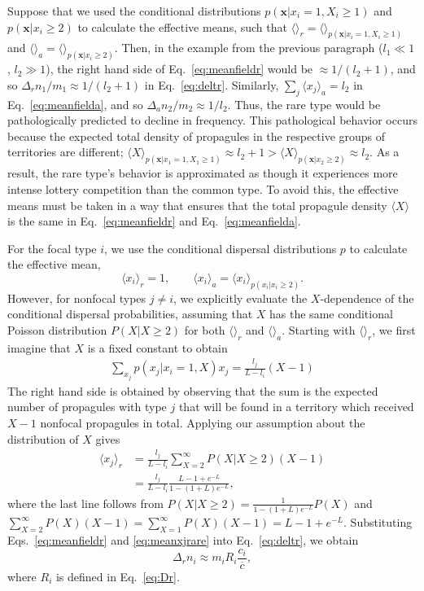 \documentclass[12pt]{article}
\begin{document}
Suppose that we used the conditional distributions $p({\mathbf x}|x_i=1,X_i\geq 1)$ and $p({\mathbf x}|x_i\geq 2)$ to calculate the effective means, such that $\langle \rangle_r=\langle \rangle_{p({\mathbf x}|x_i=1,X_i\geq 1)}$ and $\langle \rangle_a=\langle \rangle_{p({\mathbf x}|x_i\geq 2)}$. Then, in the example from the previous paragraph ($l_1\ll 1$, $l_2\gg 1$), the right hand side of Eq.~\eqref{eq:meanfieldr} would be $\approx 1/(l_2+1)$, and so $\Delta_r n_1/m_1 \approx 1/(l_2+1)$ in Eq.~\eqref{eq:deltr}. Similarly, $\sum_j \langle x_j\rangle_a = l_2$ in Eq.~\eqref{eq:meanfielda}, and so $\Delta_a n_2/m_2 \approx 1/l_2$. Thus, the rare type would be pathologically predicted to decline in frequency. This pathological behavior occurs because the expected total density of propagules in the respective groups of territories are different; $\langle X \rangle_{p({\mathbf x}|x_1=1,X_1\geq 1)}\approx l_2+1 > \langle X \rangle_{p({\mathbf x}|x_2\geq 2)}\approx l_2 $. As a result, the rare type's behavior is approximated as though it experiences more intense lottery competition than the common type. To avoid this, the effective means must be taken in a way that ensures that the total propagule density $\langle X \rangle$ is the same in Eq.~\eqref{eq:meanfieldr} and Eq.~\eqref{eq:meanfielda}. 

For the focal type $i$, we use the conditional dispersal distributions $p$ to calculate the effective mean, 
\begin{equation}
\langle x_i \rangle_r=1,\qquad \langle x_i \rangle_a = \langle x_i \rangle_{p(x_i|x_i\geq 2)}.
\end{equation}
However, for nonfocal types $j\neq i$, we explicitly evaluate the $X$-dependence of the conditional dispersal probabilities, assuming that $X$ has the same conditional Poisson distribution $P(X|X\geq 2)$ for both $\langle \rangle_r$ and $\langle \rangle_a$. Starting with $\langle \rangle_r$, we first imagine that $X$ is a fixed constant to obtain
\begin{align}
\sum_{x_j} p(x_j|x_i=1,X)x_j=\frac{l_j}{L-l_i}(X-1)
\label{eq:raremonster1}
\end{align}
The right hand side is obtained by observing that the sum is the expected number of propagules with type $j$ that will be found in a territory which received $X-1$ nonfocal propagules in total. Applying our assumption about the distribution of $X$ gives
\begin{align}
\langle x_j \rangle_r&=\frac{l_j}{L-l_i}\sum_{X=2}^{\infty} P(X|X\geq 2) (X-1)\nonumber\\
&=\frac{l_j}{L-l_i}\frac{L-1+e^{-L}}{1-(1+L)e^{-L}},
\label{eq:meanxjrare}
\end{align}
where the last line follows from $P(X|X\geq 2) =\frac{1}{{1-(1+L)e^{-L}}}P(X)$ and $\sum_{X=2}^{\infty} P(X)(X-1)=\sum_{X=1}^{\infty} P(X)(X-1)=L-1+e^{-L}$. Substituting Eqs.~\eqref{eq:meanfieldr} and \eqref{eq:meanxjrare} into Eq.~\eqref{eq:deltr}, we obtain
\begin{equation}
\Delta_r n_i\approx m_i R_i\frac{c_i}{\overline{c}}, \label{eq:deltrfinal}
\end{equation}
where $R_i$ is defined in Eq.~\eqref{eq:Dr}.
\end{document}
